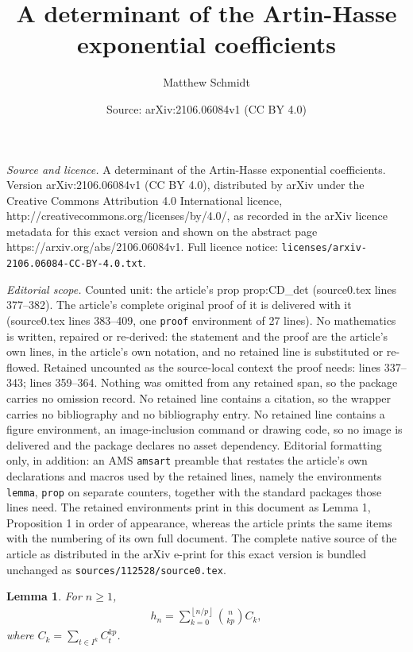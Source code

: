 \documentclass[10pt,a4paper]{amsart}
\title{A determinant of the Artin-Hasse exponential coefficients}
\author{Matthew Schmidt}
\date{Source: arXiv:2106.06084v1 (CC BY 4.0)}
\newtheorem{lemma}{Lemma}
\newcommand{\floor}[1]{\left \lfloor #1 \right \rfloor}
\begin{document}
\maketitle

\noindent\emph{Source and licence.} A determinant of the Artin-Hasse exponential coefficients. Version arXiv:2106.06084v1 (CC BY 4.0), distributed by arXiv under the Creative Commons Attribution 4.0 International licence, http://creativecommons.org/licenses/by/4.0/, as recorded in the arXiv licence metadata for this exact version and shown on the abstract page https://arxiv.org/abs/2106.06084v1. Full licence notice: \texttt{licenses/arxiv-2106.06084-CC-BY-4.0.txt}.\par\smallskip

\noindent\textit{Editorial scope.} Counted unit: the article's prop prop:CD\_det (source0.tex lines 377--382). The article's complete original proof of it is delivered with it (source0.tex lines 383--409, one \texttt{proof} environment of 27 lines). No mathematics is written, repaired or re-derived: the statement and the proof are the article's own lines, in the article's own notation, and no retained line is substituted or re-flowed.  Retained uncounted as the source-local context the proof needs: lines 337--343; lines 359--364.  Nothing was omitted from any retained span, so the package carries no omission record.  No retained line contains a citation, so the wrapper carries no bibliography and no bibliography entry.  No retained line contains a figure environment, an image-inclusion command or drawing code, so no image is delivered and the package declares no asset dependency.  Editorial formatting only, in addition: an AMS \texttt{amsart} preamble that restates the article's own declarations and macros used by the retained lines, namely the environments \texttt{lemma}, \texttt{prop} on separate counters, together with the standard packages those lines need.  The retained environments print in this document as Lemma 1, Proposition 1 in order of appearance, whereas the article prints the same items with the numbering of its own full document.  The complete native source of the article as distributed in the arXiv e-print for this exact version is bundled unchanged as \texttt{sources/112528/source0.tex}.
\begin{lemma}\label{lemma:h_n_expans}
For $n\geq 1$,
\begin{align*}
	h_n = \sum_{k=0}^{\floor{n/p}} \binom{n}{kp} C_k,
\end{align*}	
where $C_k = \sum_{t\in I^k}C_t^{kp}$.
\end{lemma}
\end{document}
